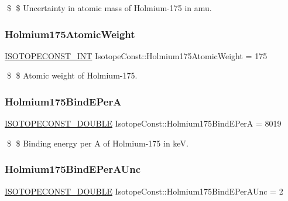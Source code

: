 \$ \$ Uncertainty in atomic mass of Holmium-\/175 in amu. \mbox{\label{group___isotope_const-_holmium-_ho175_ga5eb11cdf910eda1f6d2ae6e654d0ce65}} 
\subsubsection{\texorpdfstring{Holmium175\+Atomic\+Weight}{Holmium175AtomicWeight}}
{\footnotesize\ttfamily \mbox{\hyperlink{group___isotope_const-_macros_ga5f18360b3e99483a35c32d789e62621c}{I\+S\+O\+T\+O\+P\+E\+C\+O\+N\+S\+T\+\_\+\+I\+NT}} Isotope\+Const\+::\+Holmium175\+Atomic\+Weight = 175}

\$ \$ Atomic weight of Holmium-\/175. \mbox{\label{group___isotope_const-_holmium-_ho175_ga4ae32e58d38cd09c4a4c03893e56489c}} 
\subsubsection{\texorpdfstring{Holmium175\+Bind\+E\+PerA}{Holmium175BindEPerA}}
{\footnotesize\ttfamily \mbox{\hyperlink{group___isotope_const-_macros_ga8f45a7272ce02c0b4c65c44636ed719a}{I\+S\+O\+T\+O\+P\+E\+C\+O\+N\+S\+T\+\_\+\+D\+O\+U\+B\+LE}} Isotope\+Const\+::\+Holmium175\+Bind\+E\+PerA = 8019}

\$ \$ Binding energy per A of Holmium-\/175 in keV. \mbox{\label{group___isotope_const-_holmium-_ho175_ga89f0b0f160c57ba49ca1b92445a351fd}} 
\subsubsection{\texorpdfstring{Holmium175\+Bind\+E\+Per\+A\+Unc}{Holmium175BindEPerAUnc}}
{\footnotesize\ttfamily \mbox{\hyperlink{group___isotope_const-_macros_ga8f45a7272ce02c0b4c65c44636ed719a}{I\+S\+O\+T\+O\+P\+E\+C\+O\+N\+S\+T\+\_\+\+D\+O\+U\+B\+LE}} Isotope\+Const\+::\+Holmium175\+Bind\+E\+Per\+A\+Unc = 2}

